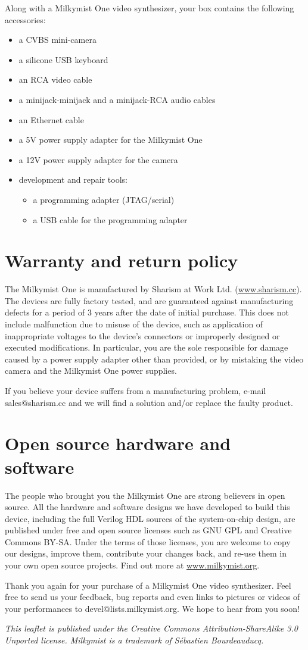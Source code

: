 \documentclass{leaflet}
\begin{document}
Along with a Milkymist One video synthesizer, your box contains the following accessories:
\begin{itemize}
\item a CVBS mini-camera
\item a silicone USB keyboard
\item an RCA video cable
\item a minijack-minijack and a minijack-RCA audio cables
\item an Ethernet cable
\item a 5V power supply adapter for the Milkymist One
\item a 12V power supply adapter for the camera
\item development and repair tools:
\begin{itemize}
\item a programming adapter (JTAG/serial)
\item a USB cable for the programming adapter
\end{itemize}
\end{itemize}

\section{Warranty and return policy}
The Milkymist One is manufactured by Sharism at Work Ltd. (\url{www.sharism.cc}). The devices are fully factory tested, and are guaranteed against manufacturing defects for a period of 3 years after the date of initial purchase. This does not include malfunction due to misuse of the device, such as application of inappropriate voltages to the device's connectors or improperly designed or executed modifications. In particular, you are the sole responsible for damage caused by a power supply adapter other than provided, or by mistaking the video camera and the Milkymist One power supplies.

If you believe your device suffers from a manufacturing problem, e-mail sales@sharism.cc and we will find a solution and/or replace the faulty product.

\section{Open source hardware and software}
The people who brought you the Milkymist One are strong believers in open source. All the hardware and software designs we have developed to build this device, including the full Verilog HDL sources of the system-on-chip design, are published under free and open source licenses such as GNU GPL and Creative Commons BY-SA. Under the terms of those licenses, you are welcome to copy our designs, improve them, contribute your changes back, and re-use them in your own open source projects. Find out more at \url{www.milkymist.org}.

Thank you again for your purchase of a Milkymist One video synthesizer. Feel free to send us your feedback, bug reports and even links to pictures or videos of your performances to devel@lists.milkymist.org. We hope to hear from you soon!

\textit{This leaflet is published under the Creative Commons Attribution-ShareAlike 3.0 Unported license. Milkymist is a trademark of S\'ebastien Bourdeauducq.}
\end{document}
